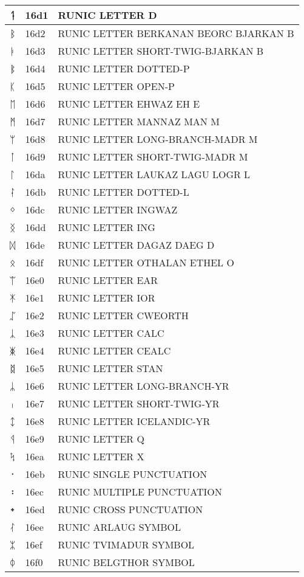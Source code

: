 \documentclass[12pt,letterpaper,openany]{book}
\begin{document}
\begin{center}
\begin{supertabular}{|m{0.25in}|m{0.5in}|m{4in}|}
ᛑ & 16d1 & RUNIC LETTER D\\\hline
ᛒ & 16d2 & RUNIC LETTER BERKANAN BEORC BJARKAN B\\\hline
ᛓ & 16d3 & RUNIC LETTER SHORT-TWIG-BJARKAN B\\\hline
ᛔ & 16d4 & RUNIC LETTER DOTTED-P\\\hline
ᛕ & 16d5 & RUNIC LETTER OPEN-P\\\hline
ᛖ & 16d6 & RUNIC LETTER EHWAZ EH E\\\hline
ᛗ & 16d7 & RUNIC LETTER MANNAZ MAN M\\\hline
ᛘ & 16d8 & RUNIC LETTER LONG-BRANCH-MADR M\\\hline
ᛙ & 16d9 & RUNIC LETTER SHORT-TWIG-MADR M\\\hline
ᛚ & 16da & RUNIC LETTER LAUKAZ LAGU LOGR L\\\hline
ᛛ & 16db & RUNIC LETTER DOTTED-L\\\hline
ᛜ & 16dc & RUNIC LETTER INGWAZ\\\hline
ᛝ & 16dd & RUNIC LETTER ING\\\hline
ᛞ & 16de & RUNIC LETTER DAGAZ DAEG D\\\hline
ᛟ & 16df & RUNIC LETTER OTHALAN ETHEL O\\\hline
ᛠ & 16e0 & RUNIC LETTER EAR\\\hline
ᛡ & 16e1 & RUNIC LETTER IOR\\\hline
ᛢ & 16e2 & RUNIC LETTER CWEORTH\\\hline
ᛣ & 16e3 & RUNIC LETTER CALC\\\hline
ᛤ & 16e4 & RUNIC LETTER CEALC\\\hline
ᛥ & 16e5 & RUNIC LETTER STAN\\\hline
ᛦ & 16e6 & RUNIC LETTER LONG-BRANCH-YR\\\hline
ᛧ & 16e7 & RUNIC LETTER SHORT-TWIG-YR\\\hline
ᛨ & 16e8 & RUNIC LETTER ICELANDIC-YR\\\hline
ᛩ & 16e9 & RUNIC LETTER Q\\\hline
ᛪ & 16ea & RUNIC LETTER X\\\hline
᛫ & 16eb & RUNIC SINGLE PUNCTUATION\\\hline
᛬ & 16ec & RUNIC MULTIPLE PUNCTUATION\\\hline
᛭ & 16ed & RUNIC CROSS PUNCTUATION\\\hline
ᛮ & 16ee & RUNIC ARLAUG SYMBOL\\\hline
ᛯ & 16ef & RUNIC TVIMADUR SYMBOL\\\hline
ᛰ & 16f0 & RUNIC BELGTHOR SYMBOL\\\hline

\end{supertabular}
\end{center}
\end{document}
